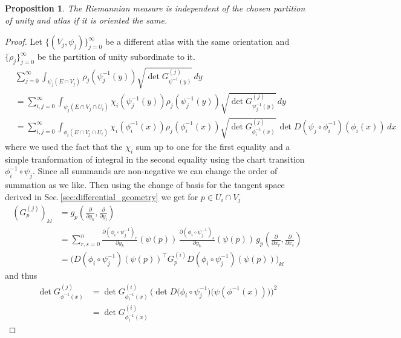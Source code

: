 \documentclass[12pt,a4paper]{article}
\numberwithin{equation}{subsection}
\numberwithin{lemma}{subsection}
\newtheorem{proposition}[lemma]{Proposition}
\theoremstyle{definition}
\begin{document}
\begin{proposition}
    The Riemannian measure is independent of the chosen partition of unity and atlas if it is 
    oriented the same.
\end{proposition}
\begin{proof}
    Let $\{(V_j, \psi_j)\}_{j=0}^\infty$ 
    be a different atlas with the same orientation and 
    $\{\rho_j\}_{j=0}^\infty$ be the partition of unity subordinate to it.
    \begin{align}
        &\sum_{j=0}^\infty \int_{\psi_j(E\cap V_j)} \rho_j(\psi_j^{-1}(y))
            \sqrt{\det G^{(j)}_{\psi^{-1}(y)}} \, dy \nonumber
        \\ &= \sum_{i,j=0}^\infty \int_{\psi_j(E\cap V_j \cap U_i)} \chi_i(\psi_j^{-1}(y)) \rho_j(\psi_j^{-1}(y))
            \sqrt{\det G^{(j)}_{\psi_j^{-1}(y)}} \, dy \nonumber
        \\ &= \sum_{i,j=0}^\infty \int_{\phi_i(E\cap V_j \cap U_i)} \chi_i(\phi_i^{-1}(x)) \rho_j(\phi_i^{-1}(x))
            \sqrt{\det G^{(j)}_{\phi_i^{-1}(x)}} \, \det D(\psi_j \circ \phi^{-1}_i)(\phi_i(x)) \, dx \label{eq:double_sum_riemannian_measure}
    \end{align}
    where we used the fact that the $\chi_i$ sum up to one for the first 
    equality and a simple tranformation of integral in the second equality
    using the chart transition $\phi_i^{-1}\circ \psi_j$. Since all summands 
    are non-negative we can change the order of summation as we like. Then using the 
    change of basis for the tangent space derived in Sec.\,\ref{sec:differential_geometry}
    we get for $p \in U_i \cap V_j$
    \begin{align*}
        (G^{(j)}_p)_{kl} &= g_p(\frac{\partial}{\partial y_k}, \frac{\partial}{\partial y_l})
        \\ &= \sum_{r,s=0}^n \frac{\partial(\phi_i \circ \psi_j^{-1})_r}{\partial y_k}(\psi(p))
            \, \frac{\partial(\phi_i \circ \psi_j^{-1})_s}{\partial y_k}(\psi(p))
            \, g_p(\frac{\partial}{\partial x_r}, \frac{\partial}{\partial x_s})
        \\ &= \bigg( D(\phi_i \circ \psi_j^{-1})(\psi(p))^\top G^{(i)}_p D(\phi_i \circ \psi_j^{-1})(\psi(p))\bigg)_{kl}
    \end{align*}
    and thus 
    \begin{align*}
        \det G^{(j)}_{\phi^{-1}(x)} 
        &= \det G^{(i)}_{\phi_i^{-1}(x)} \,
            \bigg(\det D\big(\phi_i \circ \psi_j^{-1}\big)\big(\psi(\phi^{-1}(x))\big)\bigg)^2
        \\ &= \det G^{(i)}_{\phi_i^{-1}(x)} \,

\end{align*}
\end{proof}
\end{document}
